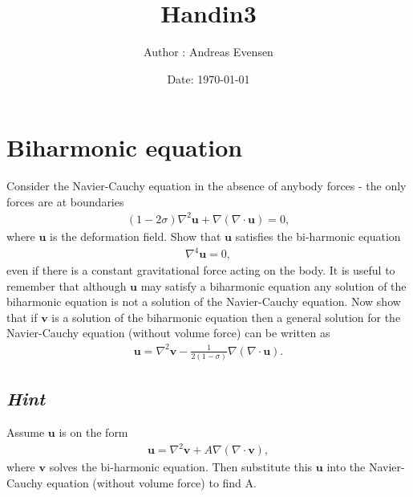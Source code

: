 \documentclass{article}
\title{Handin3}
\author{Author : Andreas Evensen}
\date{Date: \today}
\newcommand{\laplace}{\nabla^2}
\begin{document}
\maketitle
\section{Biharmonic equation}
Consider the Navier-Cauchy equation in the absence of anybody forces - the only forces are at boundaries
\begin{align}
    (1-2\sigma)\laplace\mathbf{u} + \nabla\left(\nabla\cdot \mathbf{u}\right) = 0,\label{eq:navier-cauchy}
\end{align}where $\mathbf{u}$ is the deformation field. Show that $\mathbf{u}$ satisfies the bi-harmonic equation
\begin{align*}
    \nabla^4\mathbf{u} = 0,
\end{align*}even if there is a constant gravitational force acting on the body. It is useful to remember that although
$\mathbf{u}$ may satisfy a biharmonic equation any solution of the biharmonic equation is not a solution of the Navier-Cauchy equation.
Now show that if $\mathbf{v}$ is a solution of the biharmonic equation then a general solution for the Navier-Cauchy equation (without volume force) can be written as
\begin{align*}
    \mathbf{u} = \laplace\mathbf{v} -\frac{1}{2(1-\sigma)}\nabla\left(\nabla\cdot\mathbf{u}\right).
\end{align*}
\subsection*{\textit{Hint}}
Assume $\mathbf{u}$ is on the form
\begin{align*}
    \mathbf{u} = \laplace\mathbf{v}+ A\nabla\left(\nabla\cdot\mathbf{v}\right),
\end{align*}where $\mathbf{v}$ solves the bi-harmonic equation. Then substitute this $\mathbf{u}$ into the Navier-Cauchy equation (without volume force) to find A.
\end{document}
